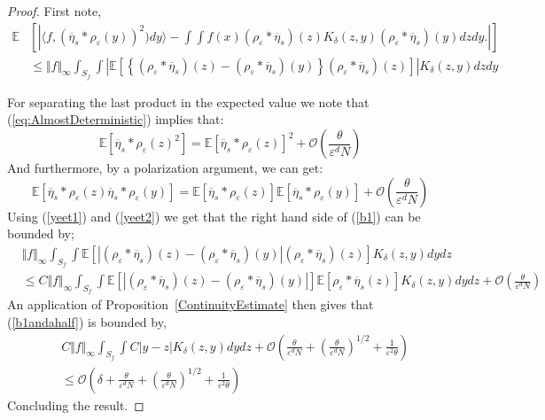 \documentclass[a4paper,12pt]{article}
\newcommand{\EE}{\mathbb{E}}
\newcommand{\1}{{\bf {1}}}
\def\epsilon{\varepsilon}
\begin{document}
\begin{proof}
First note,
\begin{align}
\mathbb{E}&\left[| \langle f, (\overline{\eta}_s * \rho_\epsilon(y))^2) dy \rangle - \int \int f(x) (\rho_\epsilon * \overline{\eta}_s)(z) K_\delta (z,y) (\rho_\epsilon * \overline{\eta}_s)(y) dz dy. |\right] \nonumber \\ &\leq  \Vert f \Vert_\infty \int_{S_f} \int \left| \mathbb{E}\left[ \left\{ (\rho_\epsilon * \overline{\eta}_s)(z)-(\rho_\epsilon * \overline{\eta}_s)(y) \right\} (\rho_\epsilon * \overline{\eta}_s)(z)\right] \right| K_\delta(z,y) dz dy    \label{b1}
\end{align}

For separating the last product in the expected value we note that (\ref{eq:AlmostDeterministic}) implies that:
\begin{equation}
\label{yeet1}
\EE[\overline{\eta}_s*\rho_\epsilon(z)^2] = \EE[\overline{\eta}_s*\rho_\epsilon(z)]^2 + \mathcal{O}\left( \frac{\theta}{\epsilon^{d}N} \right)
\end{equation}
And furthermore, by a polarization argument, we can get:
\begin{equation}
\label{yeet2}
\EE[\overline{\eta}_s*\rho_\epsilon(z) \overline{\eta}_s*\rho_\epsilon(y)] = \EE[\overline{\eta}_s*\rho_\epsilon(z)]\EE[\overline{\eta}_s*\rho_\epsilon(y)] + \mathcal{O}\left( \frac{\theta}{\epsilon^{d}N} \right)
\end{equation}
Using (\ref{yeet1}) and (\ref{yeet2}) we get that the right hand side of (\ref{b1}) can be bounded by;
\begin{align}
&\Vert f \Vert_\infty \int_{S_f} \int \mathbb{E}\left[| (\rho_\epsilon * \overline{\eta}_s)(z)-(\rho_\epsilon * \overline{\eta}_s)(y) | (\rho_\epsilon * \overline{\eta}_s)(z)\right] K_\delta(z,y) dy dz   \nonumber \\ &\leq C \Vert f \Vert_\infty \int_{S_f} \int \mathbb{E}\left[| (\rho_\epsilon * \overline{\eta}_s)(z)-(\rho_\epsilon * \overline{\eta}_s)(y) |\right] \mathbb{E}\left[\rho_\epsilon * \overline{\eta}_s(z) \right] K_\delta(z,y) dy dz + \mathcal{O}\left( \frac{\theta}{\epsilon^{d}N} \right)   \label{b1andahalf}
\end{align}
An application of Proposition~\ref{ContinuityEstimate} then gives that (\ref{b1andahalf}) is bounded by,
\begin{align*}
&C\Vert f \Vert_\infty \int_{S_f} \int C   | y - z|  K_\delta(z,y) dy dz + \mathcal{O}\left( \frac{\theta}{\epsilon^d N} + \left( \frac{\theta}{\epsilon^d N} \right)^{1/2} + \frac{1}{\epsilon^2 \theta} \right)  \\ & \leq  \mathcal{O}\left(\delta +  \frac{\theta}{\epsilon^d N} + \left( \frac{\theta}{\epsilon^d N} \right)^{1/2} + \frac{1}{\epsilon^2 \theta} \right) 
\end{align*}
Concluding the result.
\end{proof}
\end{document}

